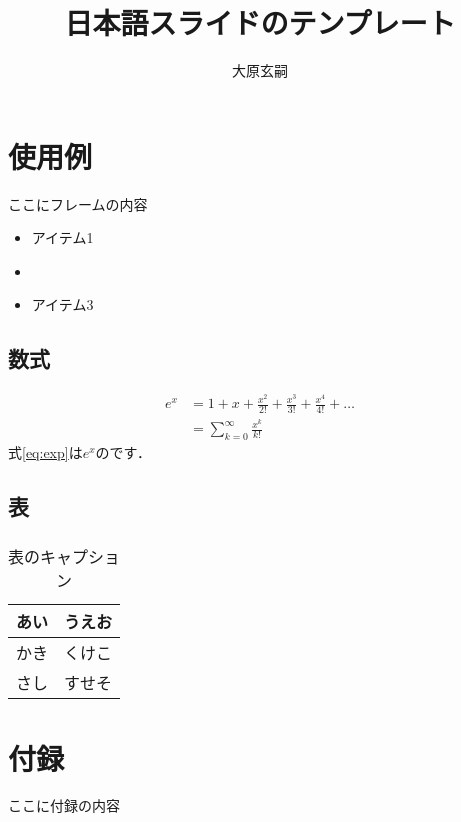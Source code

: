 \documentclass[aspectratio=169]{slide-ja}
\title{日本語スライドのテンプレート}
\author{大原玄嗣}
\begin{document}
\section{使用例}

\begin{frame}{}
  ここにフレームの内容
  \begin{itemize}
    \item アイテム1
    \item {}
    \item アイテム3
  \end{itemize}
\end{frame}

\subsection{数式}

\begin{frame}{}
  \begin{align}
    \label{eq:exp}
    e^x & = 1 + x + \frac{x^2}{2!} + \frac{x^3}{3!} + \frac{x^4}{4!} + \ldots \\
        & =\sum_{k=0}^\infty \frac{x^k}{k!}
  \end{align}
  式\eqref{eq:exp}は$e^x$のです．
\end{frame}

\subsection{表}

\begin{frame}
  \frametitle{}
  \begin{table}
    \caption{表のキャプション}
    \begin{tabular}{ll}
      \toprule
      あい & うえお \\
      \midrule
      かき & くけこ \\
      さし & すせそ \\
      \bottomrule
    \end{tabular}
  \end{table}
\end{frame}

\appendix
\section{付録}

\begin{frame}{}
  ここに付録の内容
\end{frame}
\end{document}

